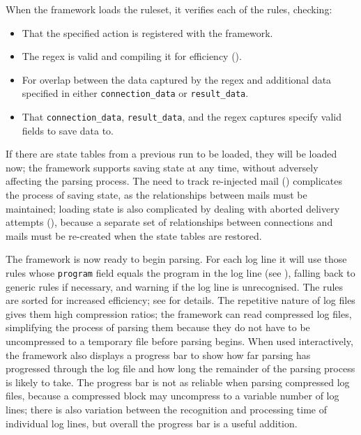 When the framework loads the ruleset, it verifies each of the rules,
checking:

\begin{itemize}

    \squeezeitems{}

    \item That the specified action is registered with the framework.

    \item The regex is valid and compiling it for efficiency
        ().

    \item For overlap between the data captured by the regex and additional
        data specified in either \texttt{connection\_data} or
        \texttt{result\_data}.

    \item That \texttt{connection\_data}, \texttt{result\_data}, and the
        regex captures specify valid fields to save data to.

\end{itemize}

If there are state tables from a previous \parsername{} run to be loaded,
they will be loaded now; the framework supports saving state at any time,
without adversely affecting the parsing process.  The need to track
re-injected mail () complicates the process
of saving state, as the relationships between mails must be maintained;
loading state is also complicated by dealing with aborted delivery attempts
(), because a separate set of
relationships between connections and mails must be re-created when the
state tables are restored.

The framework is now ready to begin parsing.  For each log line it will use
those rules whose \texttt{program} field equals the program in the log line
(see ), falling back to
generic rules if necessary, and warning if the log line is unrecognised.
The rules are sorted for increased efficiency; see  for details.  The repetitive nature of log files
gives them high compression ratios; the framework can read compressed log
files, simplifying the process of parsing them because they do not have to
be uncompressed to a temporary file before parsing begins.  When used
interactively, the framework also displays a progress bar to show how far
parsing has progressed through the log file and how long the remainder of
the parsing process is likely to take.  The progress bar is not as reliable
when parsing compressed log files, because a compressed block may
uncompress to a variable number of log lines; there is also variation
between the recognition and processing time of individual log lines, but
overall the progress bar is a useful addition.

